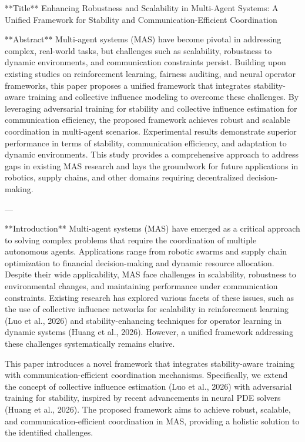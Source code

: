 **Title**  
Enhancing Robustness and Scalability in Multi-Agent Systems: A Unified Framework for Stability and Communication-Efficient Coordination  

**Abstract**  
Multi-agent systems (MAS) have become pivotal in addressing complex, real-world tasks, but challenges such as scalability, robustness to dynamic environments, and communication constraints persist. Building upon existing studies on reinforcement learning, fairness auditing, and neural operator frameworks, this paper proposes a unified framework that integrates stability-aware training and collective influence modeling to overcome these challenges. By leveraging adversarial training for stability and collective influence estimation for communication efficiency, the proposed framework achieves robust and scalable coordination in multi-agent scenarios. Experimental results demonstrate superior performance in terms of stability, communication efficiency, and adaptation to dynamic environments. This study provides a comprehensive approach to address gaps in existing MAS research and lays the groundwork for future applications in robotics, supply chains, and other domains requiring decentralized decision-making.

---

**Introduction**  
Multi-agent systems (MAS) have emerged as a critical approach to solving complex problems that require the coordination of multiple autonomous agents. Applications range from robotic swarms and supply chain optimization to financial decision-making and dynamic resource allocation. Despite their wide applicability, MAS face challenges in scalability, robustness to environmental changes, and maintaining performance under communication constraints. Existing research has explored various facets of these issues, such as the use of collective influence networks for scalability in reinforcement learning (Luo et al., 2026) and stability-enhancing techniques for operator learning in dynamic systems (Huang et al., 2026). However, a unified framework addressing these challenges systematically remains elusive.

This paper introduces a novel framework that integrates stability-aware training with communication-efficient coordination mechanisms. Specifically, we extend the concept of collective influence estimation (Luo et al., 2026) with adversarial training for stability, inspired by recent advancements in neural PDE solvers (Huang et al., 2026). The proposed framework aims to achieve robust, scalable, and communication-efficient coordination in MAS, providing a holistic solution to the identified challenges.

